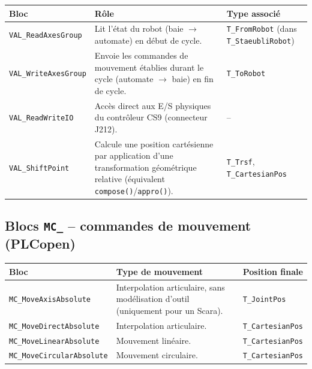 \begin{center}
    \begin{tabular}{|p{3.6cm}|p{7cm}|p{3.6cm}|}
        \hline
        \textbf{Bloc} & \textbf{Rôle} & \textbf{Type associé} \\
        \hline
        \texttt{VAL\_ReadAxesGroup} & Lit l'état du robot (baie $\to$ automate) en début de cycle. & \texttt{T\_FromRobot} (dans \texttt{T\_StaeubliRobot}) \\
        \hline
        \texttt{VAL\_WriteAxesGroup} & Envoie les commandes de mouvement établies durant le cycle (automate $\to$ baie) en fin de cycle. & \texttt{T\_ToRobot} \\
        \hline
        \texttt{VAL\_ReadWriteIO} & Accès direct aux E/S physiques du contrôleur CS9 (connecteur J212). & -- \\
        \hline
        \texttt{VAL\_ShiftPoint} & Calcule une position cartésienne par application d'une transformation géométrique relative (équivalent \texttt{compose()}/\texttt{appro()}). & \texttt{T\_Trsf}, \texttt{T\_CartesianPos} \\
        \hline
    \end{tabular}
\end{center}

\subsection{Blocs \texttt{MC\_} -- commandes de mouvement (PLCopen)}

\begin{center}
    \begin{tabular}{|p{4.6cm}|p{5.4cm}|p{4.2cm}|}
        \hline
        \textbf{Bloc} & \textbf{Type de mouvement} & \textbf{Position finale} \\
        \hline
        \texttt{MC\_MoveAxisAbsolute} & Interpolation articulaire, sans modélisation d'outil (uniquement pour un Scara). & \texttt{T\_JointPos} \\
        \hline
        \texttt{MC\_MoveDirectAbsolute} & Interpolation articulaire. & \texttt{T\_CartesianPos} \\
        \hline
        \texttt{MC\_MoveLinearAbsolute} & Mouvement linéaire. & \texttt{T\_CartesianPos} \\
        \hline
        \texttt{MC\_MoveCircularAbsolute} & Mouvement circulaire. & \texttt{T\_CartesianPos} \\
        \hline
    \end{tabular}
\end{center}

